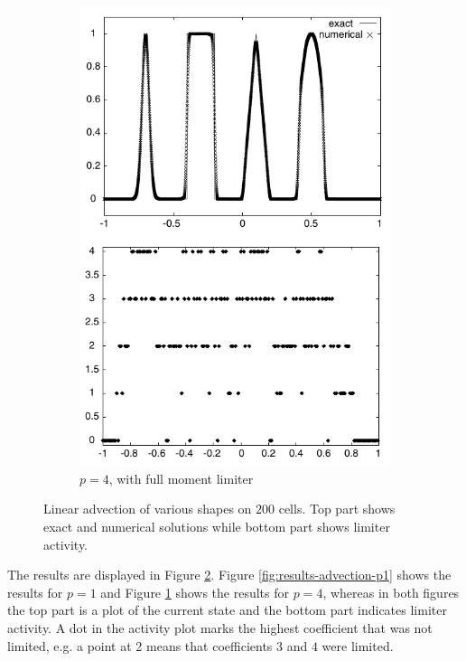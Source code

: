 \begin{figure}[h]
\begin{subfigure}[t]{0.48\columnwidth}
    \includegraphics[width=\textwidth]{figures/moment-p-4}
    \caption{$p = 4$, with full moment limiter}
    \label{fig:results-advection-p4}
  \end{subfigure}
  \caption{Linear advection of various shapes on $200$ cells. Top part shows exact and numerical solutions while bottom part shows limiter activity. \cite[Figure 2]{Krivodonova}}
  \label{fig:results-advection}
\end{figure}

The results are displayed in Figure \ref{fig:results-advection}.
Figure \ref{fig:results-advection-p1} shows the results for $p = 1$ and Figure \ref{fig:results-advection-p4} shows the results for $p = 4$, whereas in both figures the top part is a plot of the current state and the bottom part indicates limiter activity.
A dot in the activity plot marks the highest coefficient that was not limited, e.g. a point at 2 means that coefficients $3$ and $4$ were limited.

